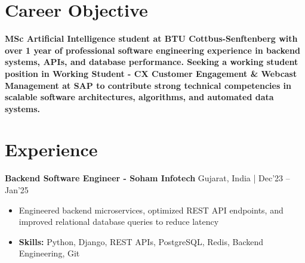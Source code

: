 \documentclass[a4paper,11pt]{article}
\begin{document}
\vspace{-7mm}

\section{\textbf{Career Objective}}
\vspace{1mm}

\textbf{MSc Artificial Intelligence student at BTU Cottbus-Senftenberg with over 1 year of professional software engineering experience in backend systems, APIs, and database performance. Seeking a working student position in Working Student - CX Customer Engagement \& Webcast Management at SAP to contribute strong technical competencies in scalable software architectures, algorithms, and automated data systems.}
\section{\textbf{Experience}}


\vspace{1mm}
  \textbf{Backend Software Engineer - Soham Infotech} \hfill Gujarat, India | Dec'23 -- Jan'25
\vspace{-1.5mm} %
\begin{itemize}
  \item Engineered backend microservices, optimized REST API endpoints, and improved relational database queries to reduce latency


\vspace{-2mm}
  \item \textbf{Skills:} Python, Django, REST APIs, PostgreSQL, Redis, Backend Engineering, Git
\end{itemize}
\end{document}
